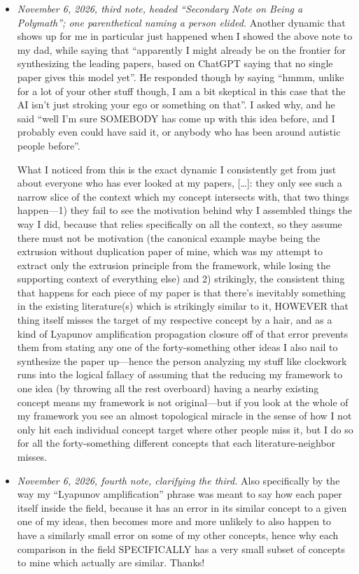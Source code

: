 \begin{itemize}
\item \emph{November 6, 2026, third note, headed ``Secondary Note on Being a Polymath''; one parenthetical naming a person elided.} Another dynamic that shows up for me in particular just happened when I showed the above note to my dad, while saying that ``apparently I might already be on the frontier for synthesizing the leading papers, based on ChatGPT saying that no single paper gives this model yet''. He responded though by saying ``hmmm, unlike for a lot of your other stuff though, I am a bit skeptical in this case that the AI isn’t just stroking your ego or something on that''. I asked why, and he said ``well I’m sure SOMEBODY has come up with this idea before, and I probably even could have said it, or anybody who has been around autistic people before''. \par What I noticed from this is the exact dynamic I consistently get from just about everyone who has ever looked at my papers, [\ldots]: they only see such a narrow slice of the context which my concept intersects with, that two things happen—1) they fail to see the motivation behind why I assembled things the way I did, because that relies specifically on all the context, so they assume there must not be motivation (the canonical example maybe being the extrusion without duplication paper of mine, which was my attempt to extract only the extrusion principle from the framework, while losing the supporting context of everything else) and 2) strikingly, the consistent thing that happens for each piece of my paper is that there’s inevitably something in the existing literature(s) which is strikingly similar to it, HOWEVER that thing itself misses the target of my respective concept by a hair, and as a kind of Lyapunov amplification propagation closure off of that error prevents them from stating any one of the forty-something other ideas I also nail to synthesize the paper up—hence the person analyzing my stuff like clockwork runs into the logical fallacy of assuming that the reducing my framework to one idea (by throwing all the rest overboard) having a nearby existing concept means my framework is not original—but if you look at the whole of my framework you see an almost topological miracle in the sense of how I not only hit each individual concept target where other people miss it, but I do so for all the forty-something different concepts that each literature-neighbor misses.
\item \emph{November 6, 2026, fourth note, clarifying the third.} Also specifically by the way my ``Lyapunov amplification'' phrase was meant to say how each paper itself inside the field, because it has an error in its similar concept to a given one of my ideas, then becomes more and more unlikely to also happen to have a similarly small error on some of my other concepts, hence why each comparison in the field SPECIFICALLY has a very small subset of concepts to mine which actually are similar. Thanks!

\end{itemize}
